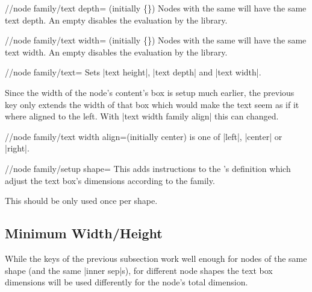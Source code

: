 \begin{key}{/\tikzext/node family/text depth= (initially \{\})}
Nodes with the same   will have the same text depth.
An empty  disables the evaluation by the library.
\end{key}

\begin{key}{/\tikzext/node family/text width= (initially \{\})}
Nodes with the same  will have the same text width.
An empty  disables the evaluation by the library.
\end{key}

\begin{key}{/\tikzext/node family/text=}
Sets |text height|, |text depth| and |text width|.
\end{key}

Since the width of the node's content's box is setup much earlier,
the previous key only extends the width of that box which would make the text
seem as if it where aligned to the left.
With |text width family align| this can changed.
\begin{key}{/\tikzext/node family/text width align=(initially center)}
 is one of |left|, |center| or |right|.

\begin{codeexample}[preamble=\usetikzlibrary{positioning,ext.node-families},/tikz/node distance=.5cm]
\tikzexternaldisable %
\end{codeexample}
\end{key}

\begin{key}{/\tikzext/node family/setup shape=}
This adds instructions to the 's definition which
adjust the text box's dimensions according to the family.

This should be only used once per shape.
\end{key}

\subsection{Minimum Width/Height}
While the keys of the previous subsection work well enough for nodes of the same shape
(and the same |inner sep|s), for different node shapes the text box dimensions will be used
differently for the node's total dimension.

